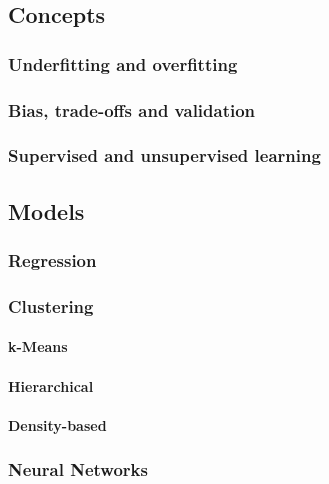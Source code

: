 \subsection{Concepts}

\subsubsection{Underfitting and overfitting}

\subsubsection{Bias, trade-offs and validation}

\subsubsection{Supervised and unsupervised learning}

\subsection{Models}

\subsubsection{Regression}

\subsubsection{Clustering}

\paragraph*{k-Means}

\paragraph*{Hierarchical}

\paragraph*{Density-based}

\subsubsection{Neural Networks}

